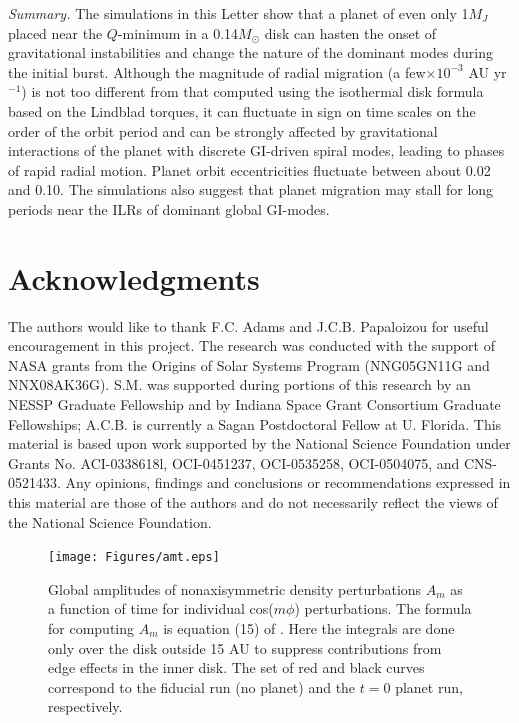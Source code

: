 \documentclass[12pt,manuscript,authoryear]{aastex}
\begin{document}
{\it Summary.} The simulations in this Letter show that a planet of even only 1$M_J$ placed near the $Q$-minimum in a 0.14$M_{\odot}$ disk can hasten the onset of gravitational instabilities and change the nature of the dominant modes during the initial burst. Although the magnitude of radial migration (a few$\times10^{-3}$ AU yr$^{-1}$) is not too different from that computed using the \citet{tanaka2002}  isothermal disk formula based on the Lindblad torques, it can fluctuate in sign on time scales on the order of the orbit period and can be strongly affected by gravitational interactions of the planet with discrete GI-driven spiral modes, leading to phases of rapid radial motion. Planet orbit eccentricities fluctuate between about 0.02 and 0.10. The simulations also suggest that planet migration may stall for long periods near the ILRs of dominant global GI-modes.

\section{Acknowledgments}

The authors would like to thank F.C. Adams and J.C.B. Papaloizou for useful encouragement in this project. The research was conducted with the support of NASA grants from the Origins of Solar Systems  Program (NNG05GN11G and NNX08AK36G). S.M. was supported during portions of this research by an NESSP Graduate Fellowship and by Indiana Space Grant Consortium Graduate Fellowships; A.C.B. is currently a Sagan Postdoctoral Fellow at U. Florida. This material is based upon work supported by the National Science Foundation under Grants No. ACI-0338618l, OCI-0451237, OCI-0535258, OCI-0504075, and CNS-0521433. Any opinions, findings and conclusions or recommendations expressed in this material are those of the authors and do not necessarily reflect the views of the National Science Foundation. 




\newpage


\begin{figure}[t]
\center
\texttt{[image: Figures/amt.eps]}
\caption{Global amplitudes of nonaxisymmetric density perturbations $A_m$ as a function of time for individual cos($m\phi$) perturbations. The formula for computing $A_m$ is equation (15) of \citep{boley2006}. Here the integrals are done only over the disk outside 15 AU to suppress contributions from edge effects in the inner disk. The set of red and black curves correspond to the fiducial run (no planet) and the $t = 0$ planet run, respectively.}
\label{fig:Am}
\end{figure}
\end{document}
